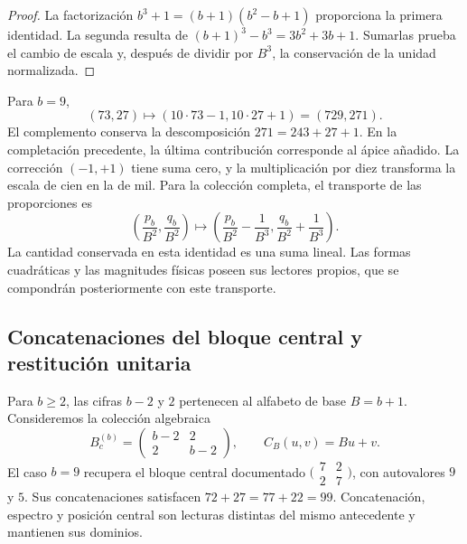 \begin{proof}
La factorización \(b^3+1=(b+1)(b^2-b+1)\) proporciona la primera
identidad. La segunda resulta de
\((b+1)^3-b^3=3b^2+3b+1\). Sumarlas prueba el cambio de escala y,
después de dividir por \(B^3\), la conservación de la unidad normalizada.
\end{proof}

Para \(b=9\),
\begin{equation}
 (73,27)\longmapsto(10\cdot73-1,10\cdot27+1)=(729,271).
 \label{lib03:caso-729}
\end{equation}
El complemento conserva la descomposición \(271=243+27+1\). En la
completación precedente, la última contribución corresponde al ápice
añadido. La corrección \((-1,+1)\) tiene suma cero, y la multiplicación
por diez transforma la escala de cien en la de mil. Para la colección
completa, el transporte de las proporciones es
\begin{equation}
 \left(\frac{p_b}{B^2},\frac{q_b}{B^2}\right)
 \longmapsto
 \left(\frac{p_b}{B^2}-\frac1{B^3},
       \frac{q_b}{B^2}+\frac1{B^3}\right).
 \label{lib03:fracciones-completacion}
\end{equation}
La cantidad conservada en esta identidad es una suma lineal. Las formas
cuadráticas y las magnitudes físicas poseen sus lectores propios, que se
compondrán posteriormente con este transporte.

\subsection{Concatenaciones del bloque central y restitución unitaria}
\label{lib03:centro}

Para \(b\geq2\), las cifras \(b-2\) y \(2\) pertenecen al alfabeto de
base \(B=b+1\). Consideremos la colección algebraica
\begin{equation}
 B_c^{(b)}=\begin{pmatrix}b-2&2\\2&b-2\end{pmatrix},\qquad
 C_B(u,v)=Bu+v.
 \label{lib03:bloque-central}
\end{equation}
El caso \(b=9\) recupera el bloque central documentado
\(\bigl(\begin{smallmatrix}7&2\\2&7\end{smallmatrix}\bigr)\), con
autovalores \(9\) y \(5\). Sus concatenaciones satisfacen
\(72+27=77+22=99\). Concatenación, espectro y posición central son
lecturas distintas del mismo antecedente y mantienen sus dominios.

